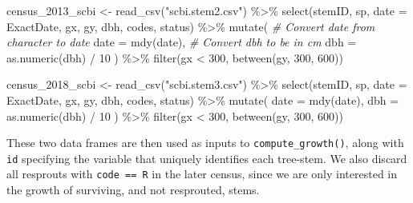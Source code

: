 \documentclass[12pt]{article}
\newenvironment{Shaded}{\begin{snugshade}}{\end{snugshade}}
\newcommand{\AttributeTok}[1]{\textcolor[rgb]{0.77,0.63,0.00}{#1}}
\newcommand{\CommentTok}[1]{\textcolor[rgb]{0.56,0.35,0.01}{\textit{#1}}}
\newcommand{\DecValTok}[1]{\textcolor[rgb]{0.00,0.00,0.81}{#1}}
\newcommand{\FunctionTok}[1]{\textcolor[rgb]{0.00,0.00,0.00}{#1}}
\newcommand{\NormalTok}[1]{#1}
\newcommand{\OtherTok}[1]{\textcolor[rgb]{0.56,0.35,0.01}{#1}}
\newcommand{\SpecialCharTok}[1]{\textcolor[rgb]{0.00,0.00,0.00}{#1}}
\newcommand{\StringTok}[1]{\textcolor[rgb]{0.31,0.60,0.02}{#1}}
\begin{document}
\begin{Shaded}
\begin{Highlighting}[]
\NormalTok{census\_2013\_scbi }\OtherTok{\textless{}{-}} \FunctionTok{read\_csv}\NormalTok{(}\StringTok{"scbi.stem2.csv"}\NormalTok{) }\SpecialCharTok{\%\textgreater{}\%}
  \FunctionTok{select}\NormalTok{(stemID, sp, }\AttributeTok{date =}\NormalTok{ ExactDate, gx, gy, dbh, codes, status) }\SpecialCharTok{\%\textgreater{}\%}
  \FunctionTok{mutate}\NormalTok{(}
    \CommentTok{\# Convert date from character to date}
    \AttributeTok{date =} \FunctionTok{mdy}\NormalTok{(date),}
    \CommentTok{\# Convert dbh to be in cm}
    \AttributeTok{dbh =} \FunctionTok{as.numeric}\NormalTok{(dbh) }\SpecialCharTok{/} \DecValTok{10}
\NormalTok{  ) }\SpecialCharTok{\%\textgreater{}\%}
  \FunctionTok{filter}\NormalTok{(gx }\SpecialCharTok{\textless{}} \DecValTok{300}\NormalTok{, }\FunctionTok{between}\NormalTok{(gy, }\DecValTok{300}\NormalTok{, }\DecValTok{600}\NormalTok{))}

\NormalTok{census\_2018\_scbi }\OtherTok{\textless{}{-}} \FunctionTok{read\_csv}\NormalTok{(}\StringTok{"scbi.stem3.csv"}\NormalTok{) }\SpecialCharTok{\%\textgreater{}\%}
  \FunctionTok{select}\NormalTok{(stemID, sp, }\AttributeTok{date =}\NormalTok{ ExactDate, gx, gy, dbh, codes, status) }\SpecialCharTok{\%\textgreater{}\%}
  \FunctionTok{mutate}\NormalTok{(}
    \AttributeTok{date =} \FunctionTok{mdy}\NormalTok{(date),}
    \AttributeTok{dbh =} \FunctionTok{as.numeric}\NormalTok{(dbh) }\SpecialCharTok{/} \DecValTok{10}
\NormalTok{  ) }\SpecialCharTok{\%\textgreater{}\%}
  \FunctionTok{filter}\NormalTok{(gx }\SpecialCharTok{\textless{}} \DecValTok{300}\NormalTok{, }\FunctionTok{between}\NormalTok{(gy, }\DecValTok{300}\NormalTok{, }\DecValTok{600}\NormalTok{))}
\end{Highlighting}
\end{Shaded}

These two data frames are then used as inputs to
\texttt{compute\_growth()}, along with \texttt{id} specifying the
variable that uniquely identifies each tree-stem. We also discard all
resprouts with \texttt{code\ ==\ R} in the later census, since we are
only interested in the growth of surviving, and not resprouted, stems.
\end{document}
